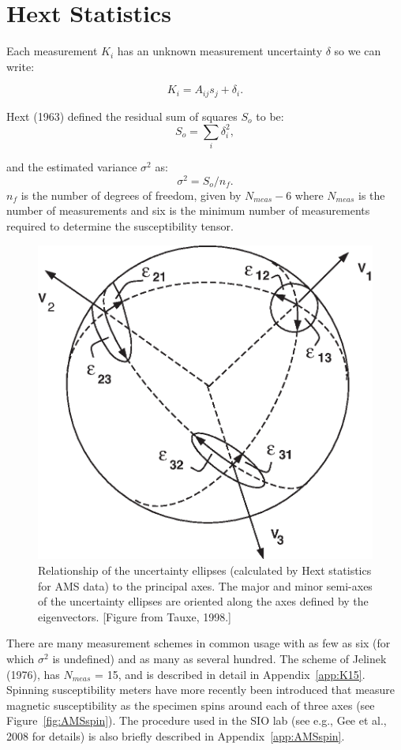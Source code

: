 \section{Hext Statistics}
\label{sect:hext}

Each measurement $K_i$ has an unknown
measurement uncertainty $\delta$ so we can write:  

\begin{equation}
K_i = A_{ij}s_j + \delta_i.
\label{eq:kdel}
\end{equation}

\noindent
Hext (1963) defined  the residual sum of squares $S_o$ to be:
\begin{equation}
S_o= \sum_i \delta_i^2 , 
\label{eq:So}
\end{equation}

and the estimated variance $\sigma^2$ as:
\begin{equation}
\sigma^2=S_o/n_f.
\label{eq:s2}
\end{equation}
\noindent $n_f$ is the number of degrees of freedom, given
by $N_{meas}-6$ where $N_{meas}$ is the number of measurements and six is the minimum number of measurements required to determine the susceptibility tensor.  


\begin{figure} [htb]
\centering  \includegraphics[width=3 in]{EPSfiles/eij.eps}
\caption
{Relationship of the uncertainty ellipses (calculated by Hext statistics for AMS 
data) to the principal axes. The major and minor semi-axes of the
 uncertainty ellipses are oriented along the axes defined by the
eigenvectors. [Figure from Tauxe, 1998.] }
\label{fig:eij}
\end{figure}
\nocite{tauxe98}


There are  many measurement schemes in common usage with as few as six (for which  $\sigma^2$ is undefined)  and as many as several hundred.    The scheme of 
  Jelinek (1976), has  $N_{meas}$ = 15, and  is described in detail in Appendix~\ref{app:K15}.   Spinning susceptibility meters have more recently been introduced that measure magnetic susceptibility as the specimen spins around each of three axes (see Figure~\ref{fig:AMSspin}).   
The procedure used in the SIO lab (see e.g., 
Gee et al., 2008
 \nocite{gee08} 
for details) is also briefly described in Appendix~\ref{app:AMSspin}.  

